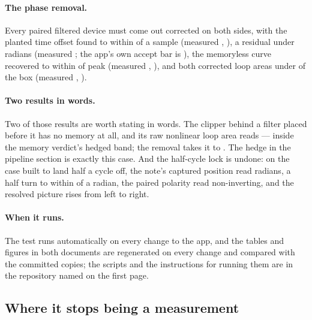 \documentclass[11pt,a4paper]{article}
\begin{document}
\paragraph{The phase removal.} Every paired filtered device must come
out corrected on both sides, with the planted time offset found to within
\tparityFrameShiftWords{} of a sample (measured
\tparityWorstFrameShiftWords, \tparityWorstFrameShift), a residual under
\tparityResidual{} radians (measured \tparityWorstResidual; the app's own
accept bar is \tcResidualToleranceRad), the memoryless curve recovered to
within \tparityCompStaticWords{} of peak (measured
\tparityWorstCompStaticWords, \tparityWorstCompStatic), and both corrected
loop areas under \tparityCompAreaWords{} of the box (measured
\tparityWorstCompAreaWords, \tparityWorstCompArea). \tparityRemovalStatus

\paragraph{Two results in words.} Two of those results are worth stating in words. The clipper behind a
filter placed before it has no memory at all, and its raw nonlinear loop
area reads \tparityPrehpRawNonlinear{} --- inside the memory verdict's
hedged band; the removal takes it to \tparityPrehpCompNonlinear{}. The
hedge in the pipeline section is exactly this case. And the half-cycle
lock is undone: on the case built to land half a cycle off, the note's
captured position read \tparityShiftPsi{} radians, a half turn to within
\tparityShiftLatticeDistanceWords{} of a radian, the paired polarity read
non-inverting, and the resolved picture rises from left to right.

\paragraph{When it runs.} The test runs automatically on every change to the app, and the tables
and figures in both documents are regenerated on every change and
compared with the committed copies; the scripts and the instructions for
running them are in the repository named on the first page.

\subsection{Where it stops being a measurement}
\end{document}
